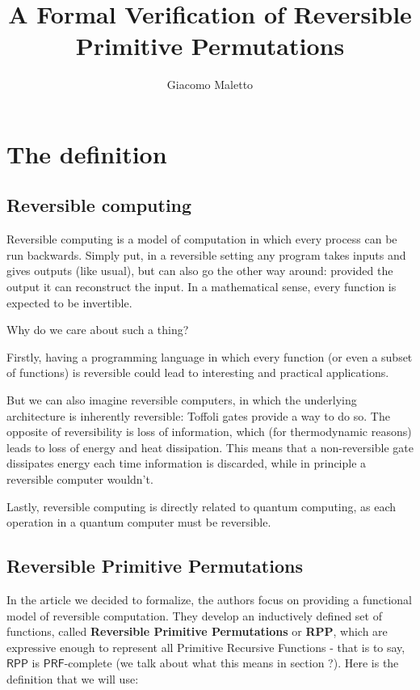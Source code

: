 \documentclass{book}
\title{A Formal Verification of Reversible Primitive Permutations}
\author{Giacomo Maletto}
\date{}
\theoremstyle{definition}
\theoremstyle{remark}
\theoremstyle{plain}
\newcommand{\RPP}{\mathsf{RPP}}
\newcommand{\PRF}{\mathsf{PRF}}
\begin{document}
\maketitle

\chapter{The definition}

\section{Reversible computing}

Reversible computing is a model of computation in which every process can be run backwards.
Simply put, in a reversible setting any program takes inputs and gives outputs (like usual), but can also go the other way around:
provided the output it can reconstruct the input.
In a mathematical sense, every function is expected to be invertible.

Why do we care about such a thing?

Firstly, having a programming language in which every function (or even a subset of functions) is reversible could lead to interesting and practical applications.

But we can also imagine reversible computers, in which the underlying architecture is inherently reversible:
Toffoli gates provide a way to do so.
The opposite of reversibility is loss of information, which (for thermodynamic reasons) leads to loss of energy and heat dissipation.
This means that a non-reversible gate dissipates energy each time information is discarded, while in principle a reversible computer wouldn't.

Lastly, reversible computing is directly related to quantum computing, as each operation in a quantum computer must be reversible.


\section{Reversible Primitive Permutations}

In the article we decided to formalize, the authors focus on providing a functional model of reversible computation.
They develop an inductively defined set of functions, called \textbf{Reversible Primitive Permutations} or \textbf{RPP},
which are expressive enough to represent all Primitive Recursive Functions -
that is to say, $\RPP$ is $\PRF$-complete (we talk about what this means in section ?).
Here is the definition that we will use:
\end{document}
